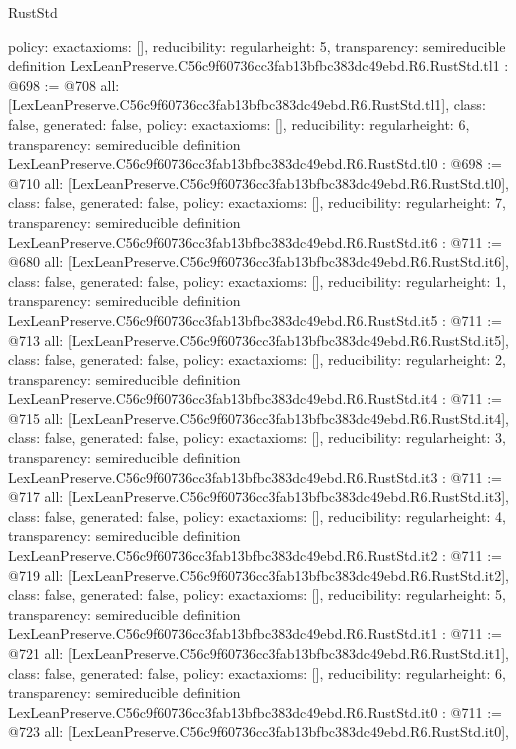 \begin{lexlean}{RustStd}
\begin{coremodule}
{  policy: exact{axioms: []},
  reducibility: regular{height: 5},
  transparency: semireducible
}
definition LexLeanPreserve.C56c9f60736cc3fab13bfbc383dc49ebd.R6.RustStd.tl1 : @698 := @708 {
  all: [LexLeanPreserve.C56c9f60736cc3fab13bfbc383dc49ebd.R6.RustStd.tl1],
  class: false,
  generated: false,
  policy: exact{axioms: []},
  reducibility: regular{height: 6},
  transparency: semireducible
}
definition LexLeanPreserve.C56c9f60736cc3fab13bfbc383dc49ebd.R6.RustStd.tl0 : @698 := @710 {
  all: [LexLeanPreserve.C56c9f60736cc3fab13bfbc383dc49ebd.R6.RustStd.tl0],
  class: false,
  generated: false,
  policy: exact{axioms: []},
  reducibility: regular{height: 7},
  transparency: semireducible
}
definition LexLeanPreserve.C56c9f60736cc3fab13bfbc383dc49ebd.R6.RustStd.it6 : @711 := @680 {
  all: [LexLeanPreserve.C56c9f60736cc3fab13bfbc383dc49ebd.R6.RustStd.it6],
  class: false,
  generated: false,
  policy: exact{axioms: []},
  reducibility: regular{height: 1},
  transparency: semireducible
}
definition LexLeanPreserve.C56c9f60736cc3fab13bfbc383dc49ebd.R6.RustStd.it5 : @711 := @713 {
  all: [LexLeanPreserve.C56c9f60736cc3fab13bfbc383dc49ebd.R6.RustStd.it5],
  class: false,
  generated: false,
  policy: exact{axioms: []},
  reducibility: regular{height: 2},
  transparency: semireducible
}
definition LexLeanPreserve.C56c9f60736cc3fab13bfbc383dc49ebd.R6.RustStd.it4 : @711 := @715 {
  all: [LexLeanPreserve.C56c9f60736cc3fab13bfbc383dc49ebd.R6.RustStd.it4],
  class: false,
  generated: false,
  policy: exact{axioms: []},
  reducibility: regular{height: 3},
  transparency: semireducible
}
definition LexLeanPreserve.C56c9f60736cc3fab13bfbc383dc49ebd.R6.RustStd.it3 : @711 := @717 {
  all: [LexLeanPreserve.C56c9f60736cc3fab13bfbc383dc49ebd.R6.RustStd.it3],
  class: false,
  generated: false,
  policy: exact{axioms: []},
  reducibility: regular{height: 4},
  transparency: semireducible
}
definition LexLeanPreserve.C56c9f60736cc3fab13bfbc383dc49ebd.R6.RustStd.it2 : @711 := @719 {
  all: [LexLeanPreserve.C56c9f60736cc3fab13bfbc383dc49ebd.R6.RustStd.it2],
  class: false,
  generated: false,
  policy: exact{axioms: []},
  reducibility: regular{height: 5},
  transparency: semireducible
}
definition LexLeanPreserve.C56c9f60736cc3fab13bfbc383dc49ebd.R6.RustStd.it1 : @711 := @721 {
  all: [LexLeanPreserve.C56c9f60736cc3fab13bfbc383dc49ebd.R6.RustStd.it1],
  class: false,
  generated: false,
  policy: exact{axioms: []},
  reducibility: regular{height: 6},
  transparency: semireducible
}
definition LexLeanPreserve.C56c9f60736cc3fab13bfbc383dc49ebd.R6.RustStd.it0 : @711 := @723 {
  all: [LexLeanPreserve.C56c9f60736cc3fab13bfbc383dc49ebd.R6.RustStd.it0],
}
\end{coremodule}
\end{lexlean}
